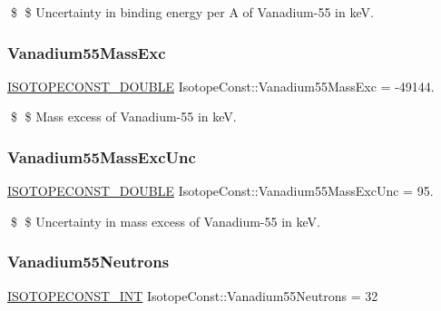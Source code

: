 \$ \$ Uncertainty in binding energy per A of Vanadium-\/55 in keV. \mbox{\label{group___isotope_const-_vanadium-_v55_ga80cb4a4ef76ae078788e34b9fd4fdcd8}} 
\subsubsection{\texorpdfstring{Vanadium55\+Mass\+Exc}{Vanadium55MassExc}}
{\footnotesize\ttfamily \mbox{\hyperlink{group___isotope_const-_macros_ga8f45a7272ce02c0b4c65c44636ed719a}{I\+S\+O\+T\+O\+P\+E\+C\+O\+N\+S\+T\+\_\+\+D\+O\+U\+B\+LE}} Isotope\+Const\+::\+Vanadium55\+Mass\+Exc = -\/49144.}

\$ \$ Mass excess of Vanadium-\/55 in keV. \mbox{\label{group___isotope_const-_vanadium-_v55_ga90f11783581a1e657278c713677a82c4}} 
\subsubsection{\texorpdfstring{Vanadium55\+Mass\+Exc\+Unc}{Vanadium55MassExcUnc}}
{\footnotesize\ttfamily \mbox{\hyperlink{group___isotope_const-_macros_ga8f45a7272ce02c0b4c65c44636ed719a}{I\+S\+O\+T\+O\+P\+E\+C\+O\+N\+S\+T\+\_\+\+D\+O\+U\+B\+LE}} Isotope\+Const\+::\+Vanadium55\+Mass\+Exc\+Unc = 95.}

\$ \$ Uncertainty in mass excess of Vanadium-\/55 in keV. \mbox{\label{group___isotope_const-_vanadium-_v55_ga9cda29a4d1d2332bf82f945bdc2d6fd6}} 
\subsubsection{\texorpdfstring{Vanadium55\+Neutrons}{Vanadium55Neutrons}}
{\footnotesize\ttfamily \mbox{\hyperlink{group___isotope_const-_macros_ga5f18360b3e99483a35c32d789e62621c}{I\+S\+O\+T\+O\+P\+E\+C\+O\+N\+S\+T\+\_\+\+I\+NT}} Isotope\+Const\+::\+Vanadium55\+Neutrons = 32}

